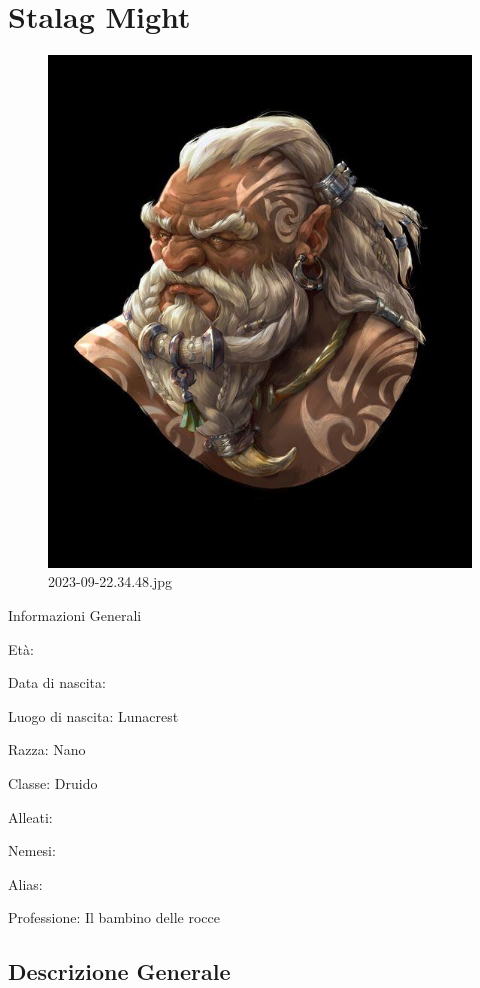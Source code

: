 \section{Stalag Might}\label{stalag-might}


\begin{figure}
\centering
\includegraphics{2023-09-17_22.34.48.jpg}
\caption{2023-09-22.34.48.jpg}
\end{figure}

Informazioni Generali

Età:

Data di nascita:

Luogo di nascita: Lunacrest

Razza: Nano

Classe: Druido

Alleati:

Nemesi:

Alias:

Professione: Il bambino delle rocce


\subsection{Descrizione Generale}\label{descrizione-generale}


